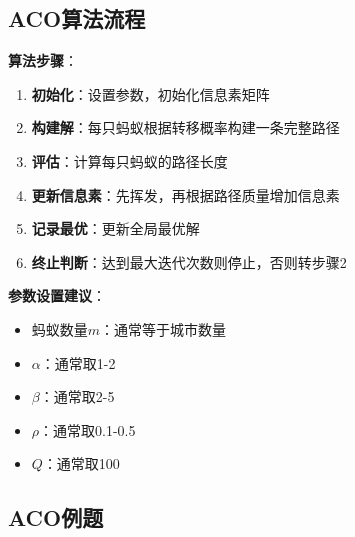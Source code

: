 \subsection{ACO算法流程}

\textbf{算法步骤}：
\begin{enumerate}[leftmargin=2em,itemsep=0pt]
    \item \textbf{初始化}：设置参数，初始化信息素矩阵
    \item \textbf{构建解}：每只蚂蚁根据转移概率构建一条完整路径
    \item \textbf{评估}：计算每只蚂蚁的路径长度
    \item \textbf{更新信息素}：先挥发，再根据路径质量增加信息素
    \item \textbf{记录最优}：更新全局最优解
    \item \textbf{终止判断}：达到最大迭代次数则停止，否则转步骤2
\end{enumerate}

\begin{notebox}
\textbf{参数设置建议}：
\begin{itemize}[itemsep=0pt]
    \item 蚂蚁数量$m$：通常等于城市数量
    \item $\alpha$：通常取1-2
    \item $\beta$：通常取2-5
    \item $\rho$：通常取0.1-0.5
    \item $Q$：通常取100
\end{itemize}
\end{notebox}

\subsection{ACO例题}

